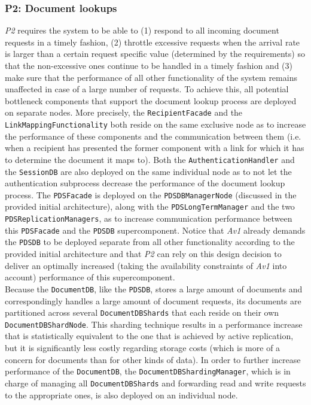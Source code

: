 \documentclass[a4paper,10pt]{article}
\begin{document}
\subsubsection{P2\@: Document lookups}\label{subsubsec:P2}
\textit{P2} requires the system to be able to (1) respond to all incoming document requests in a timely fashion, (2) throttle excessive requests when the arrival rate is larger than a certain request specific value (determined by the requirements) so that the non-excessive ones continue to be handled in a timely fashion and (3) make sure that the performance of all other functionality of the system remains unaffected in case of a large number of requests. To achieve this, all potential bottleneck components that support the document lookup process are deployed on separate nodes. More precisely, the \texttt{RecipientFacade} and the \texttt{LinkMappingFunctionality} both reside on the same exclusive node as to increase the performance of these components and the communication between them (i.e. when a recipient has presented the former component with a link for which it has to determine the document it maps to). Both the \texttt{AuthenticationHandler} and the \texttt{SessionDB} are also deployed on the same individual node as to not let the authentication subprocess decrease the performance of the document lookup process. The \texttt{PDSFacade} is deployed on the \texttt{PDSDBManagerNode} (discussed in the provided initial architecture), along with the \texttt{PDSLongTermManager} and the two \texttt{PDSReplicationManagers}, as to increase communication performance between this \texttt{PDSFacade} and the \texttt{PDSDB} supercomponent. Notice that \textit{Av1} already demands the \texttt{PDSDB} to be deployed separate from all other functionality according to the provided initial architecture and that \textit{P2} can rely on this design decision to deliver an optimally increased (taking the availability constraints of \textit{Av1} into account) performance of this supercomponent.\\
Because the \texttt{DocumentDB}, like the \texttt{PDSDB}, stores a large amount of documents and correspondingly handles a large amount of document requests, its documents are partitioned across several \texttt{DocumentDBShards} that each reside on their own \texttt{DocumentDBShardNode}. This sharding technique results in a performance increase that is statistically equivalent to the one that is achieved by active replication, but it is significantly less costly regarding storage costs (which is more of a concern for documents than for other kinds of data). In order to further increase performance of the \texttt{DocumentDB}, the \texttt{DocumentDBShardingManager}, which is in charge of managing all \texttt{DocumentDBShards} and forwarding read and write requests to the appropriate ones, is also deployed on an individual node.\\
\end{document}
